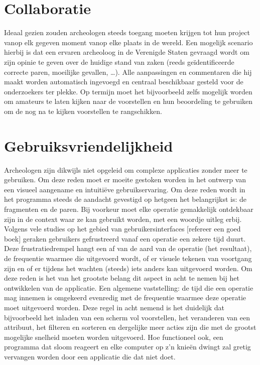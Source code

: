 \section{Collaboratie}
Ideaal gezien zouden archeologen steeds toegang moeten krijgen tot hun project vanop elk gegeven moment vanop elke plaats in de wereld. Een mogelijk scenario hierbij is dat een ervaren archeoloog in de Verenigde Staten gevraagd wordt om zijn opinie te geven over de huidige stand van zaken (reeds ge\"identificeerde correcte paren, moeilijke gevallen, \ldots). Alle aanpassingen en commentaren die hij maakt worden automatisch ingevoegd en centraal beschikbaar gesteld voor de onderzoekers ter plekke. Op termijn moet het bijvoorbeeld zelfs mogelijk worden om amateurs te laten kijken naar de voorstellen en hun beoordeling te gebruiken om de nog na te kijken voorstellen te rangschikken.

\section{Gebruiksvriendelijkheid}
Archeologen zijn dikwijls niet opgeleid om complexe applicaties zonder meer te gebruiken. Om deze reden moet er moeite gestoken worden in het ontwerp van een visueel aangename en intuiti\"eve gebruikservaring. Om deze reden wordt in het programma steeds de aandacht gevestigd op hetgeen het belangrijkst is: de fragmenten en de paren. Bij voorkeur moet elke operatie gemakkelijk ontdekbaar zijn in de context waar ze kan gebruikt worden, met een woordje uitleg erbij.\\

Volgens vele studies op het gebied van gebruikersinterfaces [refereer een goed boek] geraken gebruikers gefrustreerd vanaf een operatie een zekere tijd duurt. Deze frustratiedrempel hangt een af van de aard van de operatie (het resultaat), de frequentie waarmee die uitgevoerd wordt, of er visuele tekenen van voortgang zijn en of er tijdens het wachten (steeds) iets anders kan uitgevoerd worden. Om deze reden is het van het grootste belang dit aspect in acht te nemen bij het ontwikkelen van de applicatie. Een algemene vaststelling: de tijd die een operatie mag innemen is omgekeerd evenredig met de frequentie waarmee deze operatie moet uitgevoerd worden. Deze regel in acht nemend is het duidelijk dat bijvoorbeeld het inladen van een scherm vol voorstellen, het veranderen van een attribuut, het filteren en sorteren en dergelijke meer acties zijn die met de grootst mogelijke snelheid moeten worden uitgevoerd. Hoe functioneel ook, een programma dat sloom reageert en elke computer op z'n knie\"en dwingt zal gretig vervangen worden door een applicatie die dat niet doet.\\

